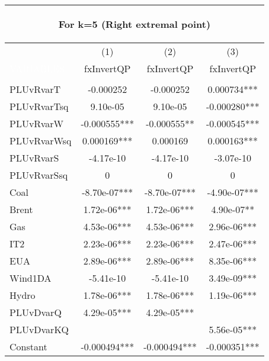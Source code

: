 \begin{center}
\begin{tabular}{lccc}
\multicolumn{4}{c}{\begin{large}For k=5 (Right extremal point)\end{large}} \\ \midrule
 & (1) & (2) & (3) \\
\textcolor{white}{VARIABLES} & fxInvertQP & fxInvertQP & fxInvertQP \\ \midrule
\vspace{4pt} & \begin{footnotesize}\end{footnotesize} & \begin{footnotesize}\end{footnotesize} & \begin{footnotesize}\end{footnotesize} \\
PLUvRvarT & -0.000252 & -0.000252 & 0.000734*** \\
PLUvRvarTsq & 9.10e-05 & 9.10e-05 & -0.000280*** \\
PLUvRvarW & -0.000555*** & -0.000555** & -0.000545*** \\
PLUvRvarWsq & 0.000169*** & 0.000169 & 0.000163*** \\
PLUvRvarS & -4.17e-10 & -4.17e-10 & -3.07e-10 \\
PLUvRvarSsq & 0 & 0 & 0 \\
Coal & -8.70e-07*** & -8.70e-07*** & -4.90e-07*** \\
Brent & 1.72e-06*** & 1.72e-06*** & 4.90e-07** \\
Gas & 4.53e-06*** & 4.53e-06*** & 2.96e-06*** \\
IT2 & 2.23e-06*** & 2.23e-06*** & 2.47e-06*** \\
EUA & 2.89e-06*** & 2.89e-06*** & 8.35e-06*** \\
Wind1DA & -5.41e-10 & -5.41e-10 & 3.49e-09*** \\
Hydro & 1.78e-06*** & 1.78e-06*** & 1.19e-06*** \\
PLUvDvarQ & 4.29e-05*** & 4.29e-05*** &  \\
PLUvDvarKQ &  &  & 5.56e-05*** \\
Constant & -0.000494*** & -0.000494*** & -0.000351*** \\

\end{tabular}
\end{center}
